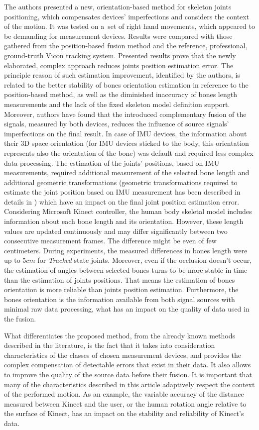 \documentclass[sensors,article,submit,moreauthors,pdftex,10pt,a4paper]{mdpi}
\begin{document}
The authors presented a new, orientation-based method for skeleton joints positioning, which compensates devices' imperfections and considers the context of the motion. It was tested on a~set of right hand movements, which appeared to be demanding for measurement devices. Results were compared with those gathered from the position-based fusion method and the reference, professional, ground-truth Vicon tracking system. Presented results prove that the newly elaborated, complex approach reduces joints position estimation error. The principle reason of such estimation improvement, identified by the authors, is related to the  better stability of bones orientation estimation in reference to the position-based method, as well as the diminished inaccuracy of bones length measurements and the lack of the fixed skeleton model definition support. Moreover, authors have found that the introduced complementary fusion of the signals, measured by both devices, reduces the influence of source signals' imperfections on the final result.
In case of IMU devices, the information about their 3D space orientation (for IMU devices sticked to the body, this orientation represents also the orientation of the bone) was default and required less complex data processing. The estimation of the joints' positions, based on IMU measurements, required additional measurement of the selected bone length and additional geometric transformations (geometric transformations required to estimate the joint position based on IMU measurement has been described in details in \cite{Kalkbrenner2014}) which have an impact on the final joint position estimation error.
Considering Microsoft Kinect controller, the human body skeletal model includes information about each bone length and its orientation. However, these length values are updated continuously and may differ significantly between two consecutive measurement frames. The difference might be even of few centimeters. During experiments, the measured differences in bones length were up to $5cm$ for \emph{Tracked} state joints.  Moreover, even if the occlusion doesn't occur, the estimation of angles between selected bones turns to be more stable in time than the estimation of joints positions. That means the estimation of bones orientation is more reliable than joints position estimation. Furthermore, the bones orientation is the information available from both signal sources with minimal raw data processing, what has an impact on the quality of data used in the fusion.  

What differentiates the proposed method, from the already known methods described in the literature, is the fact that it takes into consideration characteristics of the classes of chosen measurement devices, and provides the complex compensation of detectable errors that exist in their data. It also allows to improve the quality of the source data before their fusion. It is important that many of the characteristics described in this article adaptively respect the context of the performed motion. As an example, the variable accuracy of the distance measured between Kinect and the user, or the human rotation angle relative to the surface of Kinect, has an impact on the stability and reliability of Kinect's data.
	
\end{document}
